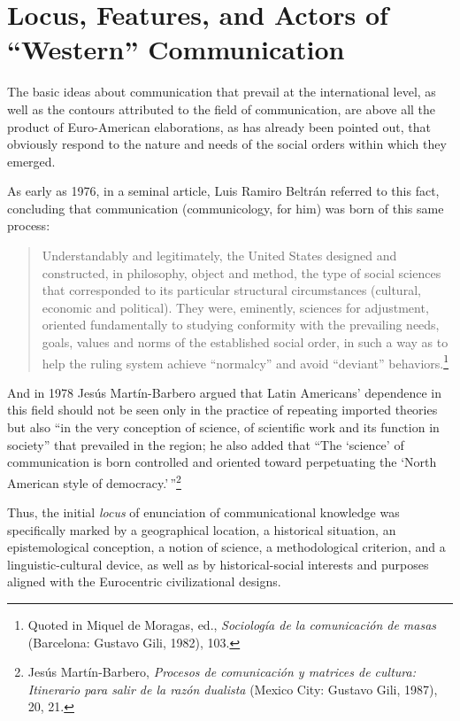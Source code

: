 \documentclass{tufte-handout}
\begin{document}
\hypertarget{locus-features-and-actors-of-western-communication}{%
\section{Locus, Features, and Actors of ``Western''
Communication}\label{locus-features-and-actors-of-western-communication}}

The basic ideas about communication that prevail at the international
level, as well as the contours attributed to the field of communication,
are above all the product of Euro-American elaborations, as has already
been pointed out, that obviously respond to the nature and needs of the
social orders within which they emerged.

As early as 1976, in a seminal article, Luis Ramiro Beltrán referred to
this fact, concluding that communication (communicology, for him) was
born of this same process:

\begin{quote}
Understandably and legitimately, the United States designed and
constructed, in philosophy, object and method, the type of social
sciences that corresponded to its particular structural circumstances
(cultural, economic and political). They were, eminently, sciences for
adjustment, oriented fundamentally to studying conformity with the
prevailing needs, goals, values and norms of the established social
order, in such a way as to help the ruling system achieve ``normalcy''
and avoid ``deviant'' behaviors.\footnote{Quoted in Miquel de Moragas,
  ed., \emph{Sociología de la comunicación de masas} (Barcelona: Gustavo
  Gili, 1982), 103.}
\end{quote}

\noindent And in 1978 Jesús Martín-Barbero argued that Latin Americans' dependence
in this field should not be seen only in the practice of repeating
imported theories but also ``in the very conception of science, of
scientific work and its function in society'' that prevailed in the
region; he also added that ``The `science' of communication is born
controlled and oriented toward perpetuating the `North American style of
democracy.'\,''\footnote{Jesús Martín-Barbero, \emph{Procesos de
  comunicación y matrices de cultura: Itinerario para salir de la razón
  dualista} (Mexico City: Gustavo Gili, 1987), 20, 21.}

Thus, the initial \emph{locus} of enunciation of communicational
knowledge was specifically marked by a geographical location, a
historical situation, an epistemological conception, a notion of
science, a methodological criterion, and a linguistic-cultural device,
as well as by historical-social interests and purposes aligned with the
Eurocentric civilizational designs.
\end{document}
